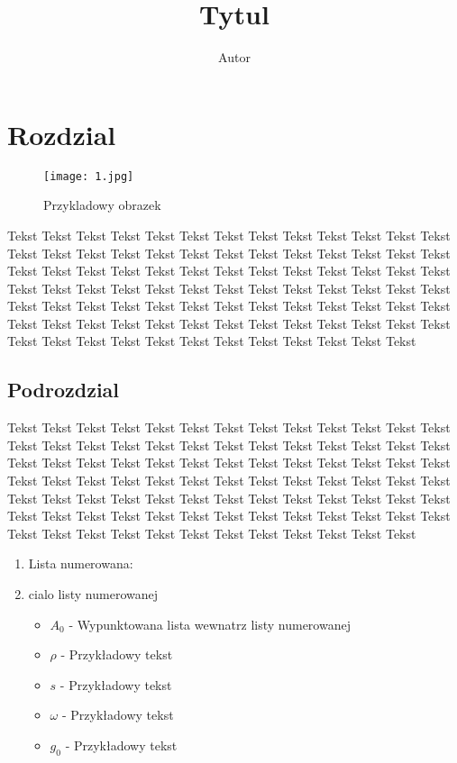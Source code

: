 \documentclass[11pt]{article} %
\title{Tytul}
\author{Autor}
\begin{document}
\maketitle

\section{Rozdzial}
\begin{wrapfigure}{r}{2in}
  \begin{center}
    \texttt{[image: 1.jpg]}
  \end{center}
  \caption{Przykladowy obrazek}
\end{wrapfigure}
Tekst Tekst Tekst Tekst Tekst Tekst Tekst Tekst Tekst Tekst Tekst Tekst Tekst Tekst Tekst Tekst Tekst Tekst Tekst Tekst Tekst Tekst Tekst Tekst Tekst Tekst Tekst Tekst Tekst Tekst Tekst Tekst Tekst Tekst Tekst Tekst Tekst Tekst Tekst Tekst Tekst Tekst Tekst Tekst Tekst Tekst Tekst Tekst Tekst Tekst Tekst Tekst Tekst Tekst Tekst Tekst Tekst Tekst Tekst Tekst Tekst Tekst Tekst Tekst Tekst Tekst Tekst Tekst Tekst Tekst Tekst Tekst Tekst Tekst Tekst Tekst Tekst Tekst Tekst Tekst Tekst Tekst Tekst Tekst Tekst Tekst Tekst Tekst Tekst Tekst 

\subsection{Podrozdzial}

Tekst Tekst Tekst Tekst Tekst Tekst Tekst Tekst Tekst Tekst Tekst Tekst Tekst Tekst Tekst Tekst Tekst Tekst Tekst Tekst Tekst Tekst Tekst Tekst Tekst Tekst Tekst Tekst Tekst Tekst Tekst Tekst Tekst Tekst Tekst Tekst Tekst Tekst Tekst Tekst Tekst Tekst Tekst Tekst Tekst Tekst Tekst Tekst Tekst Tekst Tekst Tekst Tekst Tekst Tekst Tekst Tekst Tekst Tekst Tekst Tekst Tekst Tekst Tekst Tekst Tekst Tekst Tekst Tekst Tekst Tekst Tekst Tekst Tekst Tekst Tekst Tekst Tekst Tekst Tekst Tekst Tekst Tekst Tekst Tekst Tekst Tekst Tekst Tekst Tekst 


\begin{enumerate}
\item Lista numerowana:
\item cialo listy numerowanej
    \begin{itemize}
      \item $A_{0}$  - Wypunktowana lista wewnatrz listy numerowanej
       \item $\rho$  - Przykładowy tekst
       \item $s$ - Przykładowy tekst
       \item $\omega$ - Przykładowy tekst
      \item $g_{0}$ - Przykładowy tekst
    \end{itemize}
\end{enumerate}
\end{document}
